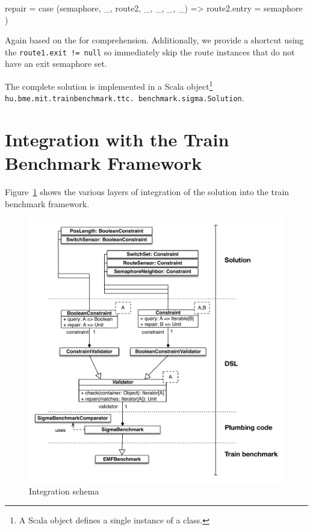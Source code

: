 \begin{itemize}[---]
\begin{scalacode}
    repair = {
      case (semaphore, _, route2, _, _, _, _) => route2.entry = semaphore
    }
  )
  \end{scalacode}
  Again based on the for comprehension.
  Additionally, we provide a shortcut using the \texttt{route1.exit != null} so immediately skip the route instances that do not have an exit semaphore set. 

\end{itemize}

The complete solution is implemented in a Scala object\footnote{A Scala object defines a single instance of a class.} \texttt{hu.bme.mit.trainbenchmark.ttc. benchmark.sigma.Solution}.

\section{Integration with the Train Benchmark Framework}
\label{sec:SchemaIntegration}

Figure~\ref{fig:IntegartionSchema} shows the various layers of integration of the solution into the train benchmark framework.

\begin{figure}[h!tb]
  \centering
  \includegraphics[width=\textwidth]{figures/integration.pdf}
  \caption{Integration schema}
  \label{fig:IntegartionSchema}
\end{figure}


